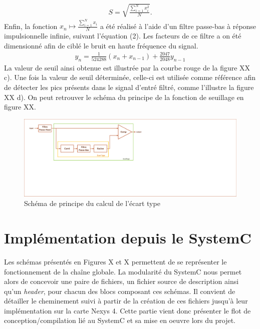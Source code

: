 \documentclass[a4paper,12pt]{article}
\begin{document}
\begin{itemize}
\begin{itemize}
\begin{eqnarray*}
S = \sqrt{\frac{\sum^N_{i=1}x_i^2}{N}}.
\end{eqnarray*}
Enfin, la fonction $x_n\mapsto\frac{\sum^N_{i=1}x_i}{N}$ a été réalisé à l'aide d'un filtre passe-bas à réponse impulsionnelle infinie, suivant l'équation (2). Les facteurs de ce filtre a on été dimensionné afin de ciblé le bruit en haute fréquence du signal.
\begin{eqnarray}
y_n = \frac{1}{524288}\left(x_n + x_{n-1}\right) + \frac{2047}{2048}y_{n-1}
\end{eqnarray}
La valeur de seuil ainsi obtenue est illustrée par la courbe rouge de la figure XX c). Une fois la valeur de seuil déterminée, celle-ci est utilisée comme référence afin de détecter les pics présents dans le signal d'entré filtré, comme
 l'illustre la figure XX d). On peut retrouver le schéma du principe de la fonction de seuillage en figure XX.
\begin{figure}[H]
\centering
\includegraphics[width=\textwidth, keepaspectratio]{chainXavier.pdf}
\caption{Schéma de principe du calcul de l'écart type}
\end{figure}
\end{itemize}
\end{itemize}
\newpage
\section{Implémentation depuis le SystemC}
	Les schémas présentés en Figures X et X permettent de se représenter le fonctionnement de la chaîne globale. La modularité du SystemC nous permet alors de concevoir une paire de fichiers, un fichier source de description ainsi qu'un \textit{header}, pour chacun des blocs composant ces schémas. Il convient de détailler le cheminement suivi à partir de la création de ces fichiers jusqu'à leur implémentation sur la carte Nexys 4. Cette partie vient donc présenter le flot de conception/compilation lié au SystemC et sa mise en oeuvre lors du projet.
\end{document}
